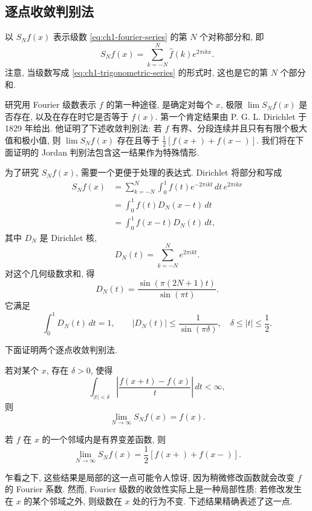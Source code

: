 \subsection{逐点收敛判别法}
\label{sec:ch1-pointwise-convergence-criteria}

以 $S_Nf(x)$ 表示级数 \eqref{eq:ch1-fourier-series} 的第 $N$ 个对称部分和, 即
\[
 S_Nf(x)=\sum_{k=-N}^{N}\widehat f(k)e^{2\pi ikx}.
\]
注意, 当级数写成 \eqref{eq:ch1-trigonometric-series} 的形式时, 这也是它的第 $N$ 个部分和.

研究用 Fourier 级数表示 $f$ 的第一种途径, 是确定对每个 $x$, 极限 $\lim S_Nf(x)$ 是否存在, 以及在存在时它是否等于 $f(x)$. 第一个肯定结果由 P. G. L. Dirichlet 于 1829 年给出. 他证明了下述收敛判别法: 若 $f$ 有界、分段连续并且只有有限个极大值和极小值, 则 $\lim S_Nf(x)$ 存在且等于 $\frac12[f(x+)+f(x-)]$. 我们将在下面证明的 Jordan 判别法包含这一结果作为特殊情形.

\hypertarget{chapter-01-page-015}{}
为了研究 $S_Nf(x)$, 需要一个更便于处理的表达式. Dirichlet 将部分和写成
\[
\begin{aligned}
 S_Nf(x)
 &=\sum_{k=-N}^{N}\int_0^1f(t)e^{-2\pi ikt}\,dt\,e^{2\pi ikx}\\
 &=\int_0^1f(t)D_N(x-t)\,dt\\
 &=\int_0^1f(x-t)D_N(t)\,dt,
\end{aligned}
\]
其中 $D_N$ 是 Dirichlet 核,
\[
 D_N(t)=\sum_{k=-N}^{N}e^{2\pi ikt}.
\]
对这个几何级数求和, 得
\begin{equation}
\label{eq:ch1-dirichlet-kernel}
 D_N(t)=\frac{\sin(\pi(2N+1)t)}{\sin(\pi t)}.
\end{equation}
它满足
\[
 \int_0^1D_N(t)\,dt=1,
 \qquad |D_N(t)|\le\frac1{\sin(\pi\delta)},
 \quad \delta\le|t|\le\frac12.
\]

下面证明两个逐点收敛判别法.

\begin{Theorem}
\label{thm:ch1-dini-criterion}
若对某个 $x$, 存在 $\delta>0$, 使得
\[
 \int_{|t|<\delta}\left|\frac{f(x+t)-f(x)}{t}\right|\,dt<\infty,
\]
则
\[
 \lim_{N\to\infty}S_Nf(x)=f(x).
\]
\end{Theorem}

\begin{Theorem}
\label{thm:ch1-jordan-criterion}
若 $f$ 在 $x$ 的一个邻域内是有界变差函数, 则
\[
 \lim_{N\to\infty}S_Nf(x)=\frac12[f(x+)+f(x-)].
\]
\end{Theorem}

乍看之下, 这些结果是局部的这一点可能令人惊讶, 因为稍微修改函数就会改变 $f$ 的 Fourier 系数. 然而, Fourier 级数的收敛性实际上是一种局部性质; 若修改发生在 $x$ 的某个邻域之外, 则级数在 $x$ 处的行为不变. 下述结果精确表述了这一点.

